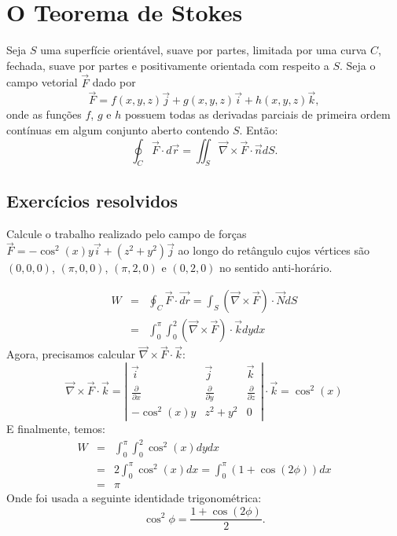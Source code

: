 \section{O Teorema de Stokes}

\begin{teo}
Seja $S$ uma superfície orientável, suave por partes, limitada por uma curva $C$, fechada, suave por partes e positivamente orientada com respeito a $S$. Seja o campo vetorial $\vec{F}$ dado por
$$
\vec{F}=f(x,y,z)\vec{j}+g(x,y,z)\vec{i}+h(x,y,z)\vec{k},
$$
onde as funções $f$, $g$ e $h$ possuem todas as derivadas parciais de primeira ordem contínuas em algum conjunto aberto contendo $S$. Então:
$$
\oint_C \vec{F}\cdot d \vec{r}=\iint_S \vec{\nabla}\times \vec{F}\cdot \vec{n} dS.
$$
\end{teo}

\subsection{Exercícios resolvidos}
\begin{exeresol}
   Calcule o trabalho realizado pelo campo de forças $\vec{F}=-\cos^2(x)y\vec{i}+(z^2+y^2)\vec{j}$ ao longo do retângulo cujos vértices são $(0,0,0)$, $(\pi,0,0)$,  $(\pi,2,0)$ e $(0,2,0)$ no sentido anti-horário.
\end{exeresol}
\begin{resol}
\begin{eqnarray*}
   W &=& \oint_C \vec{F}\cdot\vec{dr}=\int_S(\vec{\nabla}\times\vec{F})\cdot \vec{N}dS\\
   &=&\int_0^\pi\int_0^2(\vec{\nabla}\times\vec{F})\cdot \vec{k} dy dx 
   \end{eqnarray*}
   Agora, precisamos calcular $\vec{\nabla}\times\vec{F}\cdot\vec{k}$:
   $$\vec{\nabla}\times\vec{F}\cdot\vec{k}=\left|\begin{array}{ccc}
   \vec{i}&\vec{j}&\vec{k}\\
   \frac{\partial}{\partial x}&\frac{\partial}{\partial y}&\frac{\partial}{\partial z}\\
   -\cos^2(x)y&z^2+y^2&0
   \end{array}
   \right|\cdot \vec{k}=\cos^2(x)
   $$
   E finalmente, temos:
   \begin{eqnarray*}
   W&=&\int_0^\pi\int_0^2\cos^2(x)dydx\\
   &=&2\int_0^\pi\cos^2(x)dx=\int_0^\pi(1+\cos(2\phi))dx\\
   &=&\pi
   \end{eqnarray*}
   Onde foi usada a seguinte identidade trigonométrica:
   $$\cos^2\phi=\frac{1+\cos(2\phi)}{2}.$$
\end{resol}

